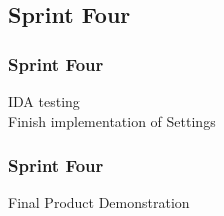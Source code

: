 \subsection{Sprint Four}
\begin{frame}
\frametitle{Sprint Four}
\begin{center}
IDA testing\\
\pause
{Finish implementation of Settings}\\
\end{center}
\end{frame}

\begin{frame}
\frametitle{Sprint Four}
\begin{center}
Final Product Demonstration
\end{center}
\end{frame}